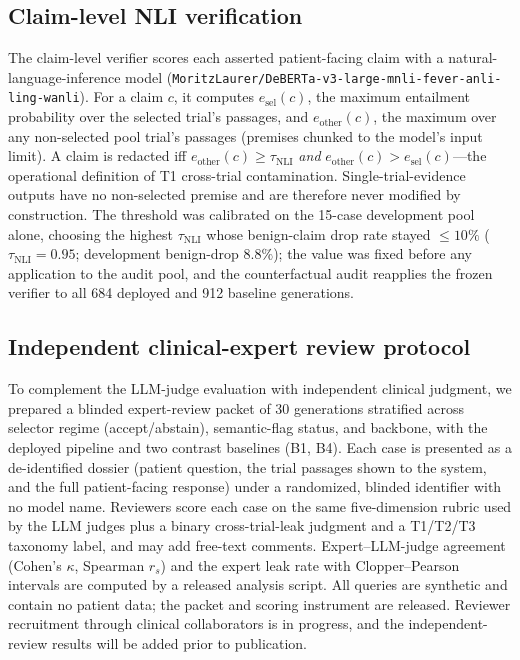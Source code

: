 \documentclass[11pt]{article}
\begin{document}
\subsection{Claim-level NLI verification}
\label{sec:methods_nli}
The claim-level verifier scores each asserted patient-facing claim with a natural-language-inference model (\texttt{MoritzLaurer/DeBERTa-v3-large-mnli-fever-anli-ling-wanli}). For a claim $c$, it computes $e_{\mathrm{sel}}(c)$, the maximum entailment probability over the selected trial's passages, and $e_{\mathrm{other}}(c)$, the maximum over any non-selected pool trial's passages (premises chunked to the model's input limit). A claim is redacted iff $e_{\mathrm{other}}(c) \ge \tau_{\mathrm{NLI}}$ \emph{and} $e_{\mathrm{other}}(c) > e_{\mathrm{sel}}(c)$---the operational definition of T1 cross-trial contamination. Single-trial-evidence outputs have no non-selected premise and are therefore never modified by construction. The threshold was calibrated on the 15-case development pool alone, choosing the highest $\tau_{\mathrm{NLI}}$ whose benign-claim drop rate stayed $\le 10\%$ ($\tau_{\mathrm{NLI}}=0.95$; development benign-drop $8.8\%$); the value was fixed before any application to the audit pool, and the counterfactual audit reapplies the frozen verifier to all 684 deployed and 912 baseline generations.

\subsection{Independent clinical-expert review protocol}
\label{sec:methods_expert}
To complement the LLM-judge evaluation with independent clinical judgment, we prepared a blinded expert-review packet of 30 generations stratified across selector regime (accept/abstain), semantic-flag status, and backbone, with the deployed pipeline and two contrast baselines (B1, B4). Each case is presented as a de-identified dossier (patient question, the trial passages shown to the system, and the full patient-facing response) under a randomized, blinded identifier with no model name. Reviewers score each case on the same five-dimension rubric used by the LLM judges plus a binary cross-trial-leak judgment and a T1/T2/T3 taxonomy label, and may add free-text comments. Expert--LLM-judge agreement (Cohen's $\kappa$, Spearman $r_s$) and the expert leak rate with Clopper--Pearson intervals are computed by a released analysis script. All queries are synthetic and contain no patient data; the packet and scoring instrument are released. Reviewer recruitment through clinical collaborators is in progress, and the independent-review results will be added prior to publication.
\end{document}
